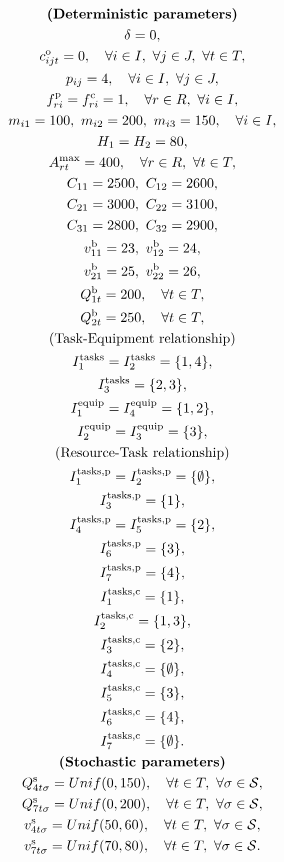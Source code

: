 \begin{gather*}
\textbf{\textrm{(Deterministic parameters)}}\\
\delta=0,\\
c_{ijt}^\textrm{o}=0,\quad\forall i\in I,\ \forall j\in J,\ \forall t\in T,\\
p_{ij}=4,\quad\forall i\in I,\ \forall j\in J,\\
f_{ri}^\textrm{p}=f_{ri}^\textrm{c}=1,\quad\forall r\in R,\ \forall i\in I,\\
m_{i1}=100,\ m_{i2}=200,\ m_{i3}=150, \quad\forall i\in I,\\
H_1=H_2=80,\\
A_{rt}^\textrm{max}=400,\quad\forall r\in R,\ \forall t\in T,\\
C_{11}=2500,\ C_{12}=2600,\\
C_{21}=3000,\ C_{22}=3100,\\
C_{31}=2800,\ C_{32}=2900,\\
v_{11}^\textrm{b}=23,\ v_{12}^\textrm{b}=24,\\
v_{21}^\textrm{b}=25,\ v_{22}^\textrm{b}=26,\\
Q_{1t}^\textrm{b}=200,\quad\forall t\in T,\\
Q_{2t}^\textrm{b}=250,\quad\forall t\in T,\\
\textrm{(Task-Equipment relationship)}\\
I_1^\textrm{tasks}=I_2^\textrm{tasks}=\{1,4\},\\
I_3^\textrm{tasks}=\{2,3\},\\
I_1^\textrm{equip}=I_4^\textrm{equip}=\{1,2\},\\
I_2^\textrm{equip}=I_3^\textrm{equip}=\{3\},\\
\textrm{(Resource-Task relationship)}\\
I_1^\textrm{tasks,p}=I_2^\textrm{tasks,p}=\{\emptyset\},\\
I_3^\textrm{tasks,p}=\{1\},\\
I_4^\textrm{tasks,p}=I_5^\textrm{tasks,p}=\{2\},\\
I_6^\textrm{tasks,p}=\{3\},\\
I_7^\textrm{tasks,p}=\{4\},\\
I_1^\textrm{tasks,c}=\{1\},\\
I_2^\textrm{tasks,c}=\{1,3\},\\
I_3^\textrm{tasks,c}=\{2\},\\
I_4^\textrm{tasks,c}=\{\emptyset\},\\
I_5^\textrm{tasks,c}=\{3\},\\
I_6^\textrm{tasks,c}=\{4\},\\
I_7^\textrm{tasks,c}=\{\emptyset\}.\\
\textbf{\textrm{(Stochastic parameters)}}\\
Q_{4t\sigma}^{\textrm{s}}=Unif(0,150),\quad\forall t\in T,\ \forall\sigma\in\mathcal{S},\\
Q_{7t\sigma}^{\textrm{s}}=Unif(0,200),\quad\forall t\in T,\ \forall\sigma\in\mathcal{S},\\
v_{4t\sigma}^{\textrm{s}}=Unif(50,60),\quad\forall t\in T,\ \forall\sigma\in\mathcal{S},\\
v_{7t\sigma}^{\textrm{s}}=Unif(70,80),\quad\forall t\in T,\ \forall\sigma\in\mathcal{S}.
\end{gather*}


